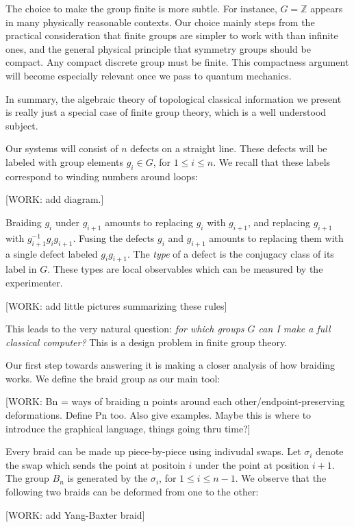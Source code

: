 \documentclass{article}
\theoremstyle{definition}
\newcommand{\ZZ}{\mathbb{Z}}
\newcommand{\0}{\left|0\right>}
\newcommand{\1}{\left|1\right>}
\numberwithin{figure}{section}
\begin{document}
The choice to make the group finite is more subtle. For instance, $G=\ZZ$ appears in many physically reasonable contexts. Our choice mainly steps from the practical consideration that finite groups are simpler to work with than infinite ones, and the general physical principle that symmetry groups should be compact. Any compact discrete group must be finite. This compactness argument will become especially relevant once we pass to quantum mechanics.

In summary, the algebraic theory of topological classical information we present is really just a special case of finite group theory, which is a well understood subject.

Our systems will consist of $n$ defects on a straight line. These defects will be labeled with group elements $g_i\in G$, for $1\leq i \leq n$. We recall that these labels correspond to winding numbers around loops:

[WORK: add diagram.]

Braiding $g_i$ under $g_{i+1}$ amounts to replacing $g_i$ with $g_{i+1}$, and replacing $g_{i+1}$ with $g_{i+1}^{-1}g_i g_{i+1}$. Fusing the defects $g_{i}$ and $g_{i+1}$ amounts to replacing them with a single defect labeled $g_{i}g_{i+1}$. The \textit{type} of a defect is the conjugacy class of its label in $G$. These types are local observables which can be measured by the experimenter.


[WORK: add little pictures summarizing these rules]

This leads to the very natural question: \textit{for which groups $G$ can I make a full classical computer?} This is a design problem in finite group theory.

Our first step towards answering it is making a closer analysis of how braiding works. We define the braid group as our main tool:

[WORK: Bn = ways of braiding n points around each other/endpoint-preserving deformations. Define Pn too. Also give examples. Maybe this is where to introduce the graphical language, things going thru time?]

Every braid can be made up piece-by-piece using indivudal swaps. Let $\sigma_{i}$ denote the swap which sends the point at positoin $i$ under the point at position $i+1$. The group $B_n$ is generated by the $\sigma_i$, for $1\leq i \leq n-1$. We observe that the following two braids can be deformed from one to the other:

[WORK: add Yang-Baxter braid]
\end{document}
